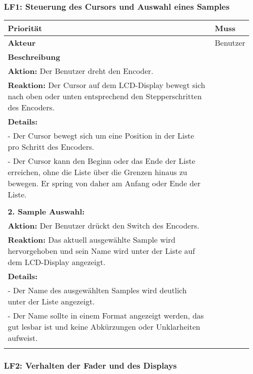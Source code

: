 \subsubsection{LF1: Steuerung des Cursors und Auswahl eines Samples}
	\hypertarget{LF01_Link}{}
\begin{longtable}[c]{|p{3cm}|p{13cm}|}
	\hline
	\textbf{Priorität} & Muss \\
	\hline
	\textbf{Akteur} & Benutzer \\
	\hline
	\textbf{Beschreibung} & 
	\begin{tabularx}{13cm}{X}
		\textbf{1. Cursor Bewegung:} \\
		\textbf{Aktion:} Der Benutzer dreht den Encoder. \\
		\textbf{Reaktion:} Der Cursor auf dem LCD-Display bewegt sich nach oben oder unten entsprechend den Stepperschritten des Encoders. \\
		\textbf{Details:} \\
		- Der Cursor bewegt sich um eine Position in der Liste pro Schritt des Encoders. \\
		- Der Cursor kann den Beginn oder das Ende der Liste erreichen, ohne die Liste über die Grenzen hinaus zu bewegen. Er spring von daher am Anfang oder Ende der Liste. \\
		\\
		\textbf{2. Sample Auswahl:} \\
		\textbf{Aktion:} Der Benutzer drückt den Switch des Encoders. \\
		\textbf{Reaktion:} Das aktuell ausgewählte Sample wird hervorgehoben und sein Name wird unter der Liste auf dem LCD-Display angezeigt. \\
		\textbf{Details:} \\
		- Der Name des ausgewählten Samples wird deutlich unter der Liste angezeigt. \\
		- Der Name sollte in einem Format angezeigt werden, das gut lesbar ist und keine Abkürzungen oder Unklarheiten aufweist. \\
	\end{tabularx} \\
	\hline
\end{longtable}

\newpage
\subsubsection{LF2: Verhalten der Fader und des Displays}


